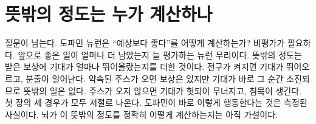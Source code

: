 \section*{뜻밖의 정도는 누가 계산하나}

질문이 남는다. 도파민 뉴런은 “예상보다 좋다”를 어떻게 계산하는가? 비평가가 필요하다. 앞으로 좋은 일이 얼마나 더 남았는지 늘 평가하는 뉴런 무리이다. 뜻밖의 정도는 받은 보상에 기대가 얼마나 뛰어올랐는지를 더한 것이다. 전구가 켜지면 기대가 뛰어오르고, 분출이 일어난다. 약속된 주스가 오면 보상은 있지만 기대가 바로 그 순간 소진되므로 뜻밖의 일은 없다. 주스가 오지 않으면 기대가 헛되이 무너지고, 침묵이 생긴다. 첫 장의 세 경우가 모두 저절로 나온다. 도파민이 바로 이렇게 행동한다는 것은 측정된 사실이다. 뇌가 이 뜻밖의 정도를 정확히 어떻게 계산하는지는 아직 가설이다.

